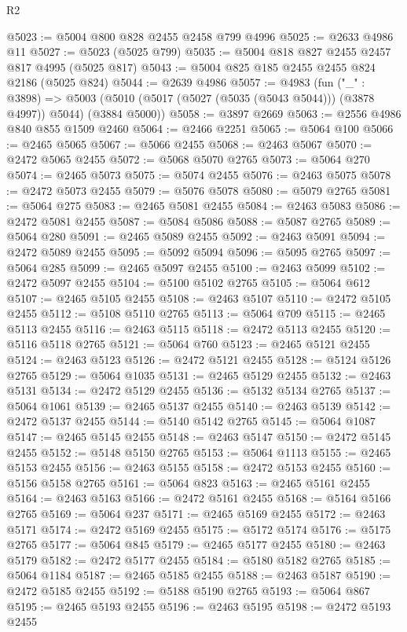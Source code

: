 \begin{lexlean}{R2}
\begin{coremodule}
@5023 := @5004 @800 @828 @2455 @2458 @799 @4996
@5025 := @2633 @4986 @11
@5027 := @5023 (@5025 @799)
@5035 := @5004 @818 @827 @2455 @2457 @817 @4995 (@5025 @817)
@5043 := @5004 @825 @185 @2455 @2455 @824 @2186 (@5025 @824)
@5044 := @2639 @4986
@5057 := @4983
    (fun ("_" : @3898) =>
    @5003 (@5010 (@5017 (@5027 (@5035 (@5043 @5044))) (@3878 @4997)) @5044) (@3884 @5000))
@5058 := @3897 @2669
@5063 := @2556 @4986 @840 @855 @1509 @2460
@5064 := @2466 @2251
@5065 := @5064 @100
@5066 := @2465 @5065
@5067 := @5066 @2455
@5068 := @2463 @5067
@5070 := @2472 @5065 @2455
@5072 := @5068 @5070 @2765
@5073 := @5064 @270
@5074 := @2465 @5073
@5075 := @5074 @2455
@5076 := @2463 @5075
@5078 := @2472 @5073 @2455
@5079 := @5076 @5078
@5080 := @5079 @2765
@5081 := @5064 @275
@5083 := @2465 @5081 @2455
@5084 := @2463 @5083
@5086 := @2472 @5081 @2455
@5087 := @5084 @5086
@5088 := @5087 @2765
@5089 := @5064 @280
@5091 := @2465 @5089 @2455
@5092 := @2463 @5091
@5094 := @2472 @5089 @2455
@5095 := @5092 @5094
@5096 := @5095 @2765
@5097 := @5064 @285
@5099 := @2465 @5097 @2455
@5100 := @2463 @5099
@5102 := @2472 @5097 @2455
@5104 := @5100 @5102 @2765
@5105 := @5064 @612
@5107 := @2465 @5105 @2455
@5108 := @2463 @5107
@5110 := @2472 @5105 @2455
@5112 := @5108 @5110 @2765
@5113 := @5064 @709
@5115 := @2465 @5113 @2455
@5116 := @2463 @5115
@5118 := @2472 @5113 @2455
@5120 := @5116 @5118 @2765
@5121 := @5064 @760
@5123 := @2465 @5121 @2455
@5124 := @2463 @5123
@5126 := @2472 @5121 @2455
@5128 := @5124 @5126 @2765
@5129 := @5064 @1035
@5131 := @2465 @5129 @2455
@5132 := @2463 @5131
@5134 := @2472 @5129 @2455
@5136 := @5132 @5134 @2765
@5137 := @5064 @1061
@5139 := @2465 @5137 @2455
@5140 := @2463 @5139
@5142 := @2472 @5137 @2455
@5144 := @5140 @5142 @2765
@5145 := @5064 @1087
@5147 := @2465 @5145 @2455
@5148 := @2463 @5147
@5150 := @2472 @5145 @2455
@5152 := @5148 @5150 @2765
@5153 := @5064 @1113
@5155 := @2465 @5153 @2455
@5156 := @2463 @5155
@5158 := @2472 @5153 @2455
@5160 := @5156 @5158 @2765
@5161 := @5064 @823
@5163 := @2465 @5161 @2455
@5164 := @2463 @5163
@5166 := @2472 @5161 @2455
@5168 := @5164 @5166 @2765
@5169 := @5064 @237
@5171 := @2465 @5169 @2455
@5172 := @2463 @5171
@5174 := @2472 @5169 @2455
@5175 := @5172 @5174
@5176 := @5175 @2765
@5177 := @5064 @845
@5179 := @2465 @5177 @2455
@5180 := @2463 @5179
@5182 := @2472 @5177 @2455
@5184 := @5180 @5182 @2765
@5185 := @5064 @1184
@5187 := @2465 @5185 @2455
@5188 := @2463 @5187
@5190 := @2472 @5185 @2455
@5192 := @5188 @5190 @2765
@5193 := @5064 @867
@5195 := @2465 @5193 @2455
@5196 := @2463 @5195
@5198 := @2472 @5193 @2455

\end{coremodule}
\end{lexlean}
